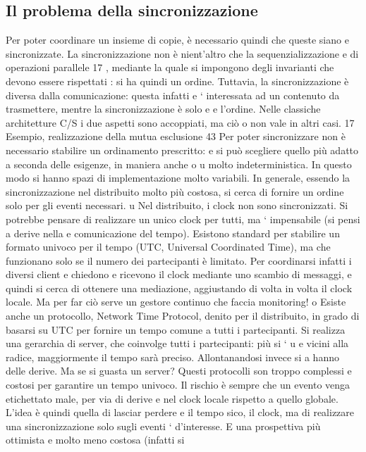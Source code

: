 \subsection{Il problema della sincronizzazione}
Per poter coordinare un insieme di copie, è necessario quindi che queste siano
e
sincronizzate. La sincronizzazione non è nient'altro che la sequenzializzazione
e
di operazioni parallele 17 , mediante la quale si impongono degli invarianti che
devono essere rispettati : si ha quindi un ordine.
Tuttavia, la sincronizzazione è diversa dalla comunicazione: questa infatti
e
` interessata ad un contenuto da trasmettere, mentre la sincronizzazione è solo
e
e
l'ordine. Nelle classiche architetture C/S i due aspetti sono accoppiati, ma ciò
o
non vale in altri casi.
17 Esempio,
realizzazione della mutua esclusione
43
Per poter sincronizzare non è necessario stabilire un ordinamento prescritto:
e
si può scegliere quello più adatto a seconda delle esigenze, in maniera anche
o
u
molto indeterministica. In questo modo si hanno spazi di implementazione
molto variabili. In generale, essendo la sincronizzazione nel distribuito molto
più costosa, si cerca di fornire un ordine solo per gli eventi necessari.
u
Nel distribuito, i clock non sono sincronizzati. Si potrebbe pensare di realizzare un unico clock per tutti, ma `
impensabile (si pensi a derive nella
e
comunicazione del tempo). Esistono standard per stabilire un formato univoco per il tempo (UTC, Universal Coordinated
Time), ma che funzionano solo
se il numero dei partecipanti è limitato. Per coordinarsi infatti i diversi client
e
chiedono e ricevono il clock mediante uno scambio di messaggi, e quindi si cerca
di ottenere una mediazione, aggiustando di volta in volta il clock locale. Ma per
far ciò serve un gestore continuo che faccia monitoring!
o
Esiste anche un protocollo, Network Time Protocol, denito per il distribuito,
in grado di basarsi su UTC per fornire un tempo comune a tutti i partecipanti.
Si realizza una gerarchia di server, che coinvolge tutti i partecipanti: più si `
u e
vicini alla radice, maggiormente il tempo sarà preciso. Allontanandosi invece si
a
hanno delle derive. Ma se si guasta un server?
Questi protocolli son troppo complessi e costosi per garantire un tempo univoco. Il rischio è sempre che un evento venga
etichettato male, per via di derive
e
nel clock locale rispetto a quello globale. L'idea è quindi quella di lasciar perdere
e
il tempo sico, il clock, ma di realizzare una sincronizzazione solo sugli eventi
`
d'interesse. E una prospettiva più ottimista e molto meno costosa (infatti si
